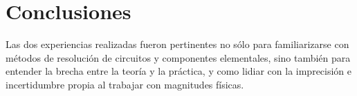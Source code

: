 \documentclass[12pt]{article}
\begin{document}
\section{Conclusiones}
Las dos experiencias realizadas fueron pertinentes no sólo para familiarizarse con métodos de resolución de circuitos y componentes elementales, sino también para entender la brecha entre la teoría y la práctica, y como lidiar con la imprecisión e incertidumbre propia al trabajar con magnitudes físicas.
\end{document}
